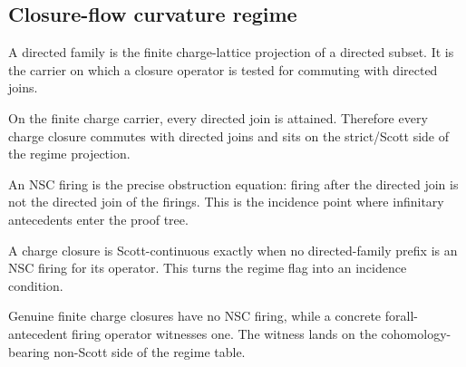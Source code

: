 \subsection{Closure-flow curvature regime}

\begin{proposition}\label{thm:directed-family-carrier}\leanok{}
A directed family is the finite charge-lattice projection of a directed subset.
It is the carrier on which a closure operator is tested for commuting with
directed joins.
\end{proposition}

\begin{theorem}\label{thm:finite-scott-continuous}\leanok{}
On the finite charge carrier, every directed join is attained.  Therefore every
charge closure commutes with directed joins and sits on the strict/Scott side
of the regime projection.
\end{theorem}

\begin{proposition}\label{thm:nsc-firing-carrier}\leanok{}
An NSC firing is the precise obstruction equation: firing after the directed
join is not the directed join of the firings.  This is the incidence point
where infinitary antecedents enter the proof tree.
\end{proposition}

\begin{theorem}\label{thm:scott-continuous-iff-no-nsc-firing}\leanok{}
A charge closure is Scott-continuous exactly when no directed-family prefix is
an NSC firing for its operator.  This turns the regime flag into an incidence
condition.
\end{theorem}

\begin{theorem}\label{thm:nsc-firing-source-of-aperiodic}\leanok{}
Genuine finite charge closures have no NSC firing, while a concrete
forall-antecedent firing operator witnesses one.  The witness lands on the
cohomology-bearing non-Scott side of the regime table.
\end{theorem}

